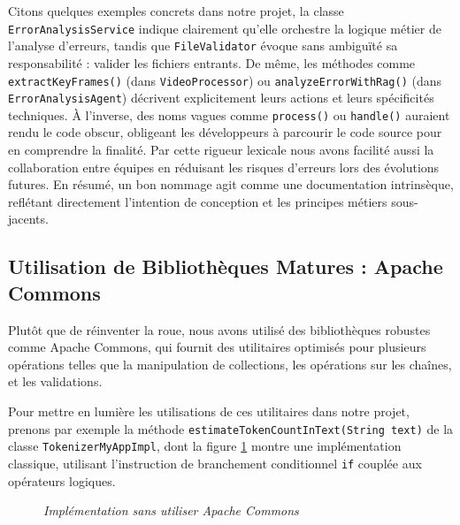 \documentclass[12pt,a4paper]{report}
\begin{document}
	Citons quelques exemples concrets dans notre projet, la classe \verb|ErrorAnalysisService| indique clairement qu'elle orchestre la logique métier de l'analyse d'erreurs, tandis que \verb|FileValidator| évoque sans ambiguïté sa responsabilité : valider les fichiers entrants. De même, les méthodes comme \verb|extractKeyFrames()| (dans \verb|VideoProcessor|) ou \verb|analyzeErrorWithRag()| (dans \\ \verb|ErrorAnalysisAgent|) décrivent explicitement leurs actions et leurs spécificités techniques. À l'inverse, des noms vagues comme \verb|process()| ou \verb|handle()| auraient rendu le code obscur, obligeant les développeurs à parcourir le code source pour en comprendre la finalité. Par cette rigueur lexicale nous avons facilité aussi la collaboration entre équipes en réduisant les risques d'erreurs lors des évolutions futures. En résumé, un bon nommage agit comme une documentation intrinsèque, reflétant directement l’intention de conception et les principes métiers sous-jacents.
	
	\subsection{Utilisation de Bibliothèques Matures : Apache Commons}
	
	Plutôt que de réinventer la roue, nous avons utilisé des bibliothèques robustes comme Apache Commons, qui fournit des utilitaires optimisés pour plusieurs opérations telles que la manipulation de collections, les opérations sur les chaînes, et les validations.
	
	Pour mettre en lumière les utilisations de ces utilitaires dans notre projet, prenons par exemple la méthode \verb|estimateTokenCountInText(String text)| de la classe \verb|TokenizerMyAppImpl|, dont la figure \ref{fig:before-string-utils} montre une implémentation classique, utilisant l'instruction de branchement conditionnel \verb|if| couplée aux opérateurs logiques.
	
	\begin{figure}[H]
		\centering
		\caption{\textit{Implémentation sans utiliser Apache Commons}}
		\label{fig:before-string-utils}
	\end{figure}
	
\end{document}
